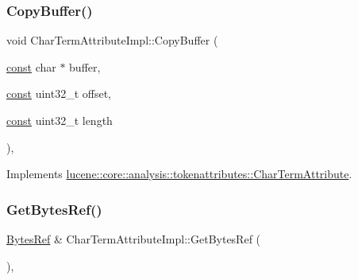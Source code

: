 \subsubsection{\texorpdfstring{Copy\+Buffer()}{CopyBuffer()}}
{\footnotesize\ttfamily void Char\+Term\+Attribute\+Impl\+::\+Copy\+Buffer (\begin{DoxyParamCaption}\item[{\mbox{\hyperlink{ZlibCrc32_8h_a2c212835823e3c54a8ab6d95c652660e}{const}} char $\ast$}]{buffer,  }\item[{\mbox{\hyperlink{ZlibCrc32_8h_a2c212835823e3c54a8ab6d95c652660e}{const}} uint32\+\_\+t}]{offset,  }\item[{\mbox{\hyperlink{ZlibCrc32_8h_a2c212835823e3c54a8ab6d95c652660e}{const}} uint32\+\_\+t}]{length }\end{DoxyParamCaption})\hspace{0.3cm}{\ttfamily [override]}, {\ttfamily [virtual]}}



Implements \mbox{\hyperlink{classlucene_1_1core_1_1analysis_1_1tokenattributes_1_1CharTermAttribute_ae03cbeb05b5b1e7c50f407e0025d41da}{lucene\+::core\+::analysis\+::tokenattributes\+::\+Char\+Term\+Attribute}}.

\mbox{\label{classlucene_1_1core_1_1analysis_1_1tokenattributes_1_1CharTermAttributeImpl_aefef8491e2a12493480fe19dd6d61ca7}} 
\subsubsection{\texorpdfstring{Get\+Bytes\+Ref()}{GetBytesRef()}}
{\footnotesize\ttfamily \mbox{\hyperlink{classlucene_1_1core_1_1util_1_1BytesRef}{Bytes\+Ref}} \& Char\+Term\+Attribute\+Impl\+::\+Get\+Bytes\+Ref (\begin{DoxyParamCaption}{ }\end{DoxyParamCaption})\hspace{0.3cm}{\ttfamily [override]}, {\ttfamily [virtual]}}



